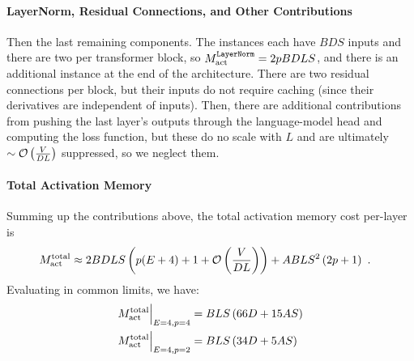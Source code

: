 \documentclass[11pt]{article}
\begin{document}
\paragraph{LayerNorm, Residual Connections, and Other Contributions}

Then the last remaining components. The  instances each have $ BDS $ inputs and
there are two per transformer block, so $ M _{ {\rm  act}  } ^\texttt{LayerNorm} = 2pBDLS $, and
there is an additional instance at the end of the architecture. There are two residual connections
per block, but their inputs do not require caching (since their derivatives are independent of
inputs). Then, there are additional contributions from pushing the last layer's outputs through the
language-model head and computing the loss function, but these do no scale with $ L $ and are
ultimately $ \sim \mathcal{O} \left( \frac{ V }{ DL } \right)  $ suppressed, so we neglect them.





\paragraph{Total Activation Memory}


Summing up the contributions above, the total activation memory cost per-layer is
\begin{align}
	M _{ {\rm act}  } ^{ {\rm  total}  } & \approx  2BDLS   \left ( p(E+4) + 1 + \mathcal{O} \left( \frac{
		V}{ DL } \right)  \right )
	+ ABLS ^{ 2 } \left ( 2p+1\right ) \label{eq_act_mem_total_no_sharding}\ .
\end{align}
Evaluating in common limits, we have:
\begin{align}
	M _{ {\rm act}  } ^{ {\rm  total}  } \Big| _{ E=4, p=4 } & =BLS \left ( 66 D+15AS  \right ) \nonumber\\
	M _{ {\rm act}  } ^{ {\rm  total}  } \Big| _{ E=4, p=2 } & =BLS \left ( 34 D+5AS  \right )
\end{align}
\end{document}
